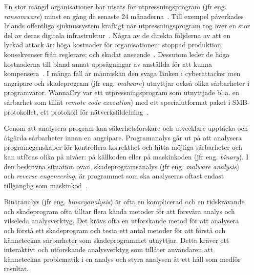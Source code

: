 En stor mängd organisationer har utsats för utpressningsprogram (jfr eng.
\emph{ransomware}) minst en gång de senaste 24 månaderna~\cite{cyberreason2021,
    cyberreason2022}. Till exempel påverkades Irlands offentliga sjuknussystem
kraftigt när utpressningsprogram tog över en stor del av deras digitala
infrastruktur~\cite{hse_report, gallagher2023}.
Några av de direkta följderna av att en lyckad attack är: höga kostnader för
organisationen; stoppad produktion; konsekvenser från reglerare;
och skadat anseende~\cite{cyberreason2021, cyberreason2022}. Dessutom leder
de höga kostnaderna till bland annat uppsägningar av anställda för att kunna
kompensera~\cite{cyberreason2021, cyberreason2022}. I
många fall är människan den svaga länken i cyberattacker men angripare och
skadeprogram (jfr eng. \emph{malware}) utnyttjar också olika sårbarheter i
programvaror. WannaCry var ett utpressningsprogram som utnyttjade bl.a. en
sårbarhet som tillät \emph{remote code execution}) med ett specialutformat
paket i SMB-protokollet, ett protokoll
för nätverksfildelning~\cite{alraddadicomprehensive}.


Genom att analysera program kan säkerhetsforskare och utvecklare upptäcka
och åtgärda sårbarheter innan en angripare. Programanalys går ut på att
analysera programegenskaper för kontrollera korrekthet och hitta möjliga
sårbarheter och kan utföras olika på nivåer: på källkoden eller på maskinkoden
(jfr eng. \emph{binary}). I den beskrivna situation ovan, skadeprogramsanalys
(jfr eng. \emph{malware analysis}) och \emph{reverse engeneering}, är
programmet som ska analyseras oftast endast tillgänglig som
maskinkod~\cite{andriesse2018}.

Binäranalys (jfr eng. \emph{binaryanalysis}) är ofta en komplicerad och en
tidskrävande och skadeprogram ofta tilltar flera kända metoder för att försvåra
analys och vilseleda analysverktyg. Det krävs ofta en utforskande metod för att
analysera och förstå ett skadeprogram och testa ett antal metoder för att
förstå och känneteckna sårbarheter som skadeprogrammet utnyttjar. Detta kräver
ett interaktivt och utforskande analysverktyg som tillåter användaren att
känneteckna problematik i en analys och styra analysen åt ett håll som medför
resultat.

